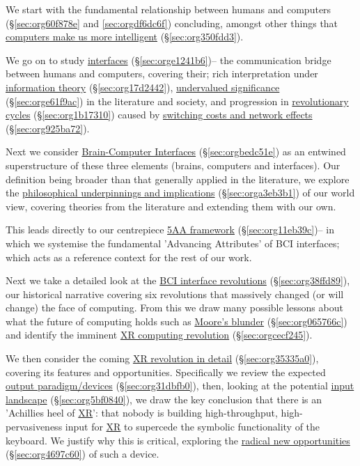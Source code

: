 \documentclass[logo,bsc,singlespacing,parskip]{infthesis}
\begin{document}
We start with the fundamental relationship between humans and computers (\S \ref{sec:org60f878e} and \ref{sec:orgdf6dc6f}) concluding, amongst other things that \hyperref[sec:org350fdd3]{computers make us more intelligent} (\S \ref{sec:org350fdd3}).

We go on to study \hyperref[sec:orge1241b6]{interfaces} (\S \ref{sec:orge1241b6})-- the communication bridge between humans and computers, covering their; rich interpretation under \hyperref[sec:org17d2442]{information theory} (\S \ref{sec:org17d2442}), \hyperref[sec:orge61f9ac]{undervalued significance} (\S \ref{sec:orge61f9ac}) in the literature and society, and progression in \hyperref[sec:org1b17310]{revolutionary cycles} (\S \ref{sec:org1b17310}) caused by \hyperref[sec:org925ba72]{switching costs and network effects} (\S \ref{sec:org925ba72}).

Next we consider \hyperref[sec:orgbedc51e]{Brain-Computer Interfaces} (\S \ref{sec:orgbedc51e}) as an entwined superstructure of these three elements (brains, computers and interfaces).
Our definition being broader than that generally applied in the literature, we explore the \hyperref[sec:orga3eb3b1]{philosophical underpinnings and implications} (\S \ref{sec:orga3eb3b1}) of our world view, covering theories from the literature and extending them with our own.

This leads directly to our centrepiece \hyperref[sec:org11eb39c]{5AA framework} (\S \ref{sec:org11eb39c})-- in which we systemise the fundamental 'Advancing Attributes' of BCI interfaces; which acts as a reference context for the rest of our work.

Next we take a detailed look at the \hyperref[sec:org38ffd89]{BCI interface revolutions} (\S \ref{sec:org38ffd89}), our historical narrative covering six revolutions that massively changed (or will change) the face of computing.
From this we draw many possible lessons about what the future of computing holds such as \hyperref[sec:org065766c]{Moore's blunder} (\S \ref{sec:org065766c}) and identify the imminent \hyperref[sec:orgcecf245]{XR computing revolution} (\S \ref{sec:orgcecf245}).

We then consider the coming \hyperref[sec:org35335a0]{XR revolution in detail} (\S \ref{sec:org35335a0}), covering its features and opportunities.
Specifically we review the expected \hyperref[sec:org31dbfb0]{output paradigm/devices} (\S \ref{sec:org31dbfb0}), then, looking at the potential \hyperref[sec:org5bf0840]{input landscape} (\S \ref{sec:org5bf0840}), we draw the key conclusion that there is an 'Achillies heel of \hyperref[org53dbe83]{XR}': that nobody is building high-throughput, high-pervasiveness input for \hyperref[org53dbe83]{XR} to supercede the symbolic functionality of the keyboard.
We justify why this is critical, exploring the \hyperref[sec:org4697c60]{radical new opportunities} (\S \ref{sec:org4697c60}) of such a device.
\end{document}
